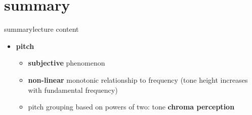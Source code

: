     \section{summary}
        \begin{frame}{summary}{lecture content}
            \begin{itemize}
                \item   \textbf{pitch}
                    \begin{itemize}
                        \item   \textbf{subjective} phenomenon
                        \smallskip
                        \item   \textbf{non-linear} monotonic relationship to frequency (tone height increases with fundamental frequency)
                        \smallskip
                        \item   pitch grouping based on powers of two: tone \textbf{chroma perception}
                    \end{itemize}
            \end{itemize}
        \end{frame}

